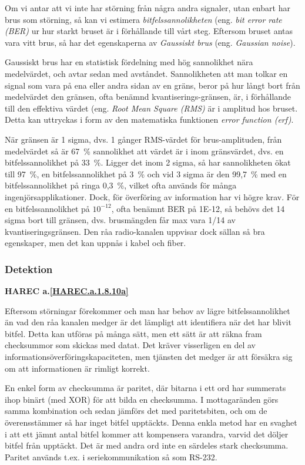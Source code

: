 Om vi antar att vi inte har störning från några andra signaler, utan enbart har
brus som störning, så kan vi estimera \emph{bitfelssannolikheten} (eng.
\emph{bit error rate (BER)} ur hur starkt bruset är i förhållande till vårt
steg. Eftersom bruset antas vara vitt brus, så har det egenskaperna av
\emph{Gaussiskt brus} (eng. \emph{Gaussian noise}).

Gaussiskt brus har en statistisk fördelning med hög sannolikhet nära
medelvärdet, och avtar sedan med avståndet. Sannolikheten att man tolkar en
signal som vara på ena eller andra sidan av en gräns, beror på hur långt bort
från medelvärdet den gränsen, ofta benämnd kvantiserings-gränsen, är, i
förhållande till den effektiva värdet (eng. \emph{Root Mean Square (RMS)} är i
amplitud hos bruset. Detta kan uttryckas i form av den matematiska funktionen
\emph{error function (erf)}.

När gränsen är 1 sigma, dvs. 1 gånger RMS-värdet för brus-amplituden, från
medelvärdet så är 67~\% sannolikhet att värdet är i inom gränsvärdet, dvs. en
bitfelssannolikhet på 33~\%.
Ligger det inom 2 sigma, så har sannolikheten ökat till 97~\%, en
bitfelssannolikhet på 3~\% och vid 3 sigma är den 99,7~\% med en
bitfelssannolikhet på ringa 0,3~\%, vilket ofta används för många
ingenjörsapplikationer. Dock, för överföring av information har vi högre krav.
För en bitfelssannolikhet på \(10^{-12}\), ofta benämnt BER på 1E-12, så
behövs det 14 sigma bort till gränsen, dvs. brusmängden får max vara 1/14 av
kvantiseringsgränsen. Den råa radio-kanalen uppvisar dock sällan så bra
egenskaper, men det kan uppnås i kabel och fiber.

\subsubsection{Detektion}
\textbf{HAREC a.\ref{HAREC.a.1.8.10a}\label{myHAREC.a.1.8.10a}}

Eftersom störningar förekommer och man har behov av lägre bitfelssannolikhet
än vad den råa kanalen medger är det lämpligt att identifiera när det har
blivit bitfel. Detta kan utföras på många sätt, men ett sätt är att räkna fram
checksummor som skickas med datat. Det kräver visserligen en del av
informationsöverföringskapaciteten, men tjänsten det medger är att försäkra sig
om att informationen är rimligt korrekt.

En enkel form av checksumma är paritet, där bitarna i ett ord har summerats ihop
binärt (med XOR) för att bilda en checksumma. I mottagaränden görs samma
kombination och sedan jämförs det med paritetsbiten, och om de överensstämmer så
har inget bitfel upptäckts. Denna enkla metod har en svaghet i att ett jämnt
antal bitfel kommer att kompensera varandra, varvid det döljer bitfel från
upptäckt. Det är med andra ord inte en särdeles stark checksumma. Paritet
används t.ex. i seriekommunikation så som RS-232.

